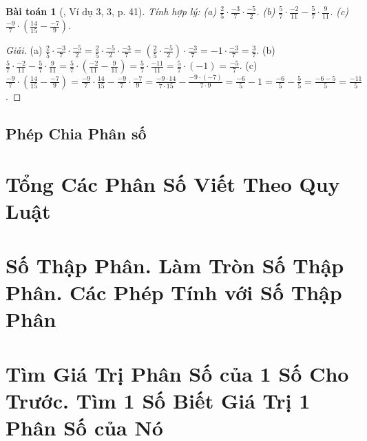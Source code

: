 \documentclass{article}
\newtheorem{baitoan}{Bài toán}
\begin{document}
\begin{baitoan}[\cite{SGK_Toan_6_Canh_Dieu_tap_2}, Ví dụ 3, 3, p. 41]
	Tính hợp lý: (a) $\frac{2}{5}\cdot\frac{-3}{7}\cdot\frac{-5}{2}$. (b) $\frac{5}{7}\cdot\frac{-2}{11} - \frac{5}{7}\cdot\frac{9}{11}$. (c) $\frac{-9}{7}\cdot\left(\frac{14}{15} - \frac{-7}{9}\right)$.
\end{baitoan}

\begin{proof}[Giải]
	(a) $\frac{2}{5}\cdot\frac{-3}{7}\cdot\frac{-5}{2} = \frac{2}{5}\cdot\frac{-5}{2}\cdot\frac{-3}{7} = \left(\frac{2}{5}\cdot\frac{-5}{2}\right)\cdot\frac{-3}{7} = -1\cdot\frac{-3}{7} = \frac{3}{7}$. (b) $\frac{5}{7}\cdot\frac{-2}{11} - \frac{5}{7}\cdot\frac{9}{11} = \frac{5}{7}\cdot\left(\frac{-2}{11} - \frac{9}{11}\right) = \frac{5}{7}\cdot\frac{-11}{11} = \frac{5}{7}\cdot(-1) = \frac{-5}{7}$. (c) $\frac{-9}{7}\cdot\left(\frac{14}{15} - \frac{-7}{9}\right) = \frac{-9}{7}\cdot\frac{14}{15} - \frac{-9}{7}\cdot\frac{-7}{9} = \frac{-9\cdot14}{7\cdot15} - \frac{-9\cdot(-7)}{7\cdot9} = \frac{-6}{5} - 1 = \frac{-6}{5} - \frac{5}{5} = \frac{-6 - 5}{5} = \frac{-11}{5}$.
\end{proof}

\subsection{Phép Chia Phân số}


\section{Tổng Các Phân Số Viết Theo Quy Luật}


\section{Số Thập Phân. Làm Tròn Số Thập Phân. Các Phép Tính với Số Thập Phân}


\section{Tìm Giá Trị Phân Số của 1 Số Cho Trước. Tìm 1 Số Biết Giá Trị 1 Phân Số của Nó}
\end{document}
